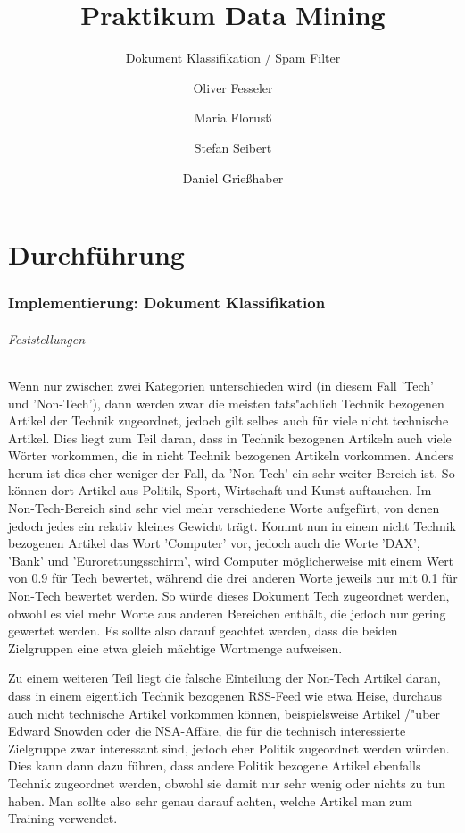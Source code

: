 \documentclass[12pt,a4paper]{scrartcl}
\begin{document}
\title{Praktikum Data Mining}
\subtitle{Dokument Klassifikation / Spam Filter}
\author{Oliver Fesseler \and Maria Florus\ss \and Stefan Seibert \and  Daniel Grie\ss haber}
\maketitle
\newpage

\part*{ Durchf\"uhrung}

\section*{Implementierung: Dokument Klassifikation}

\paragraph*{Feststellungen}
Wenn nur zwischen zwei Kategorien unterschieden wird (in diesem Fall 'Tech' und 'Non-Tech'), dann werden zwar die meisten tats"achlich Technik bezogenen Artikel der Technik zugeordnet, jedoch gilt selbes auch f\"ur viele nicht technische Artikel. Dies liegt zum Teil daran, dass in Technik bezogenen Artikeln auch viele W\"orter vorkommen, die in nicht Technik bezogenen Artikeln vorkommen. Anders herum ist dies eher weniger der Fall, da 'Non-Tech' ein sehr weiter Bereich ist. So k\"onnen dort Artikel aus Politik, Sport, Wirtschaft und Kunst auftauchen. Im Non-Tech-Bereich sind sehr viel mehr verschiedene Worte aufgef\"urt, von denen jedoch jedes ein relativ kleines Gewicht tr\"agt. Kommt nun in einem nicht Technik bezogenen Artikel das Wort 'Computer' vor, jedoch auch die Worte 'DAX', 'Bank' und 'Eurorettungsschirm', wird Computer m\"oglicherweise mit einem Wert von 0.9 f\"ur Tech bewertet, w\"ahrend die drei anderen Worte jeweils nur mit 0.1 f\"ur Non-Tech bewertet werden. So w\"urde dieses Dokument Tech zugeordnet werden, obwohl es viel mehr Worte aus anderen Bereichen enth\"alt, die jedoch nur gering gewertet werden. Es sollte also darauf geachtet werden, dass die beiden Zielgruppen eine etwa gleich m\"achtige Wortmenge aufweisen. 

Zu einem weiteren Teil liegt die falsche Einteilung der Non-Tech Artikel daran, dass in einem eigentlich Technik bezogenen RSS-Feed wie etwa Heise, durchaus auch nicht technische Artikel vorkommen k\"onnen, beispielsweise Artikel /"uber Edward Snowden oder die NSA-Aff\"are, die f\"ur die technisch interessierte Zielgruppe zwar interessant sind, jedoch eher Politik zugeordnet werden w\"urden. Dies kann dann dazu f\"uhren, dass andere Politik bezogene Artikel ebenfalls Technik zugeordnet werden, obwohl sie damit nur sehr wenig oder nichts zu tun haben. Man sollte also sehr genau darauf achten, welche Artikel man zum Training verwendet. 
\end{document}
